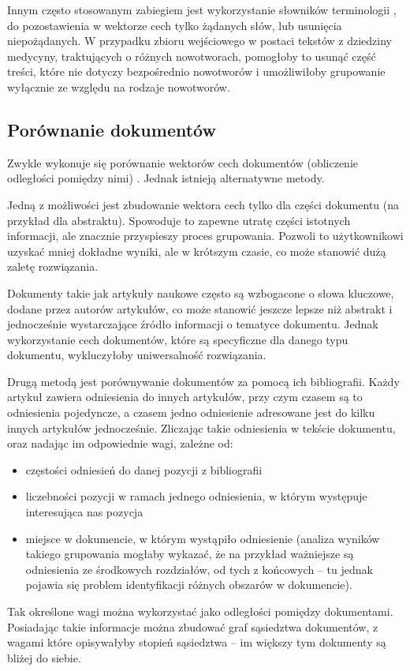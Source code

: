 \documentclass{article}
\begin{document}
Innym często stosowanym zabiegiem jest wykorzystanie słowników terminologii \cite{clustering_book,jain_clustering}, do pozostawienia w wektorze cech tylko żądanych słów, lub usunięcia niepożądanych. W przypadku zbioru wejściowego w postaci tekstów z dziedziny medycyny, traktujących o różnych nowotworach, pomogłoby to usunąć część treści, które nie dotyczy bezpośrednio nowotworów i umożliwiłoby grupowanie wyłącznie ze względu na rodzaje nowotworów.

\subsection{Porównanie dokumentów} \label{doc_comparsion_section}

Zwykle wykonuje się porównanie wektorów cech dokumentów (obliczenie odległości pomiędzy nimi) \todo{[4]}. Jednak istnieją alternatywne metody. 

Jedną z możliwości jest zbudowanie wektora cech tylko dla części dokumentu (na przykład dla abstraktu). Spowoduje to zapewne utratę części istotnych informacji, ale znacznie przyspieszy proces grupowania. Pozwoli to użytkownikowi uzyskać mniej dokładne wyniki, ale w krótszym czasie, co może stanowić dużą zaletę rozwiązania. 

Dokumenty takie jak artykuły naukowe często są wzbogacone o słowa kluczowe, dodane przez autorów artykułów, co może stanowić jeszcze lepsze niż abstrakt i jednocześnie wystarczające źródło informacji o tematyce dokumentu. Jednak wykorzystanie cech dokumentów, które są specyficzne dla danego typu dokumentu, wykluczyłoby uniwersalność rozwiązania.

Drugą metodą jest porównywanie dokumentów za pomocą ich bibliografii. Każdy artykuł zawiera odniesienia do innych artykułów, przy czym czasem są to odniesienia pojedyncze, a czasem jedno odniesienie adresowane jest do kilku innych artykułów jednocześnie. Zliczając takie odniesienia w tekście dokumentu, oraz nadając im odpowiednie wagi, zależne od:

\begin{itemize}
	\item częstości odniesień do danej pozycji z bibliografii
	\item liczebności pozycji w ramach jednego odniesienia, w którym występuje interesująca nas pozycja
	\item miejsce w dokumencie, w którym wystąpiło odniesienie (analiza wyników takiego grupowania mogłaby wykazać, że na przykład ważniejsze są odniesienia ze środkowych rozdziałów, od tych z końcowych – tu jednak pojawia się problem identyfikacji różnych obszarów w dokumencie).
\end{itemize}
Tak określone wagi można wykorzystać jako odległości pomiędzy dokumentami. Posiadając takie informacje można zbudować graf sąsiedztwa dokumentów, z wagami które opisywałyby stopień sąsiedztwa – im większy tym dokumenty są bliżej do siebie. 
\end{document}
